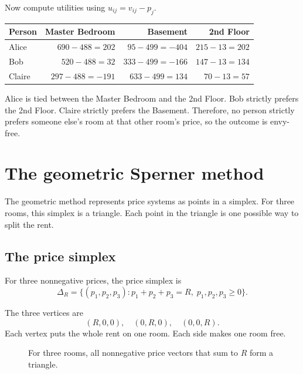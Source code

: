 \documentclass[11pt]{article}
\begin{document}
Now compute utilities using $u_{ij}=v_{ij}-p_j$.

\begin{center}
\begin{tabular}{lrrr}
\toprule
\textbf{Person} & \textbf{Master Bedroom} & \textbf{Basement} & \textbf{2nd Floor} \\
\midrule
Alice  & $690-488=202$  & $95-499=-404$   & $215-13=202$ \\
Bob    & $520-488=32$   & $333-499=-166$  & $147-13=134$ \\
Claire & $297-488=-191$ & $633-499=134$   & $70-13=57$ \\
\bottomrule
\end{tabular}
\end{center}

Alice is tied between the Master Bedroom and the 2nd Floor. Bob strictly prefers the 2nd Floor. Claire strictly prefers the Basement. Therefore, no person strictly prefers someone else's room at that other room's price, so the outcome is envy-free.

\section{The geometric Sperner method}

The geometric method represents price systems as points in a simplex. For three rooms, this simplex is a triangle. Each point in the triangle is one possible way to split the rent.

\subsection{The price simplex}

For three nonnegative prices, the price simplex is
\begin{equation}
    \Delta_R=\{(p_1,p_2,p_3):p_1+p_2+p_3=R,\;p_1,p_2,p_3\geq 0\}.
    \label{eq:pricesimplex}
\end{equation}

The three vertices are
\[
    (R,0,0),\quad (0,R,0),\quad (0,0,R).
\]
Each vertex puts the whole rent on one room. Each side makes one room free.

\begin{figure}[h]
\centering
{}
\caption{For three rooms, all nonnegative price vectors that sum to $R$ form a triangle.}
\end{figure}
\end{document}
